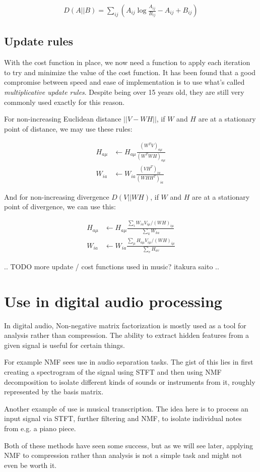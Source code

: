 \begin{align}
D(A||B) = \sum_{ij} \left( A_{ij} \log \frac{A_{ij}}{B_{ij}} - A_{ij} + B_{ij} \right)
\end{align}

\subsection{Update rules}
With the cost function in place, we now need a function to apply each iteration to try and minimize the value of the cost function. It has been found that a good compromise between speed and ease of implementation is to use what's called \emph{multiplicative update rules}. \cite{nmf_algorithms} Despite being over 15 years old, they are still very commonly used exactly for this reason.

For non-increasing Euclidean distance $||V - WH||$, if $W$ and $H$ are at a stationary point of distance, we may use these rules:

\begin{align}
H_{a \mu} & \leftarrow H_{a \mu} \frac{(W^TV)_{a \mu}}{(W^TWH)_{a \mu}} \\
W_{ia} & \leftarrow W_{ia} \frac{(VH^T)_{ia}}{(WHH^T)_{ia}}
\end{align}

And for non-increasing divergence $D(V||WH)$, if $W$ and $H$ are at a stationary point of divergence, we can use this:

\begin{align}
H_{a \mu} & \leftarrow H_{a \mu} \frac{\sum_i W_{ia} V_{i \mu} / (WH)_{i \mu}}{\sum_k W_{ka}} \\
W_{ia} & \leftarrow W_{ia} \frac{\sum_\mu H_{a \mu} V_{i \mu} / (WH)_{i \mu}}{\sum_v H_{av}}
\end{align}

.. TODO more update / cost functions used in music? itakura saito ..

\section{Use in digital audio processing}
In digital audio, Non-negative matrix factorization is mostly used as a tool for analysis rather than compression. The ability to extract hidden features from a given signal is useful for certain things.

For example NMF sees use in audio separation tasks. \cite{fevotte_audio_separation_2017} The gist of this lies in first creating a spectrogram of the signal using STFT and then using NMF decomposition to isolate different kinds of sounds or instruments from it, roughly represented by the basis matrix.

Another example of use is musical transcription. \cite{recoskie_mann_2014} The idea here is to process an input signal via STFT, further filtering and NMF, to isolate individual notes from e.g. a piano piece.

Both of these methods have seen some success, but as we will see later, applying NMF to compression rather than analysis is not a simple task and might not even be worth it.


